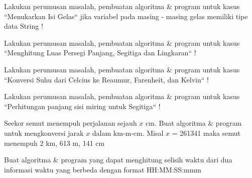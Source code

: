 \begin{pemrograman}
Lakukan perumusan masalah, pembuatan algoritma \& program untuk kasus ``Menukarkan Isi Gelas`` jika variabel pada masing - masing gelas memiliki tipe data String !
\end{pemrograman}

\begin{pemrograman}
Lakukan perumusan masalah, pembuatan algoritma \& program untuk kasus ``Menghitung Luas Persegi Panjang, Segitiga dan Lingkaran`` !
\end{pemrograman}

\begin{pemrograman}
Lakukan perumusan masalah, pembuatan algoritma \& program untuk kasus ``Konversi Suhu dari Celcius ke Reaumur, Farenheit, dan Kelvin`` !
\end{pemrograman}

\begin{pemrograman}
Lakukan perumusan masalah, pembuatan algoritma \& program untuk kasus ``Perhitungan panjang sisi miring untuk Segitiga`` !
\end{pemrograman}

\begin{pemrograman}
Seekor semut menempuh perjalanan sejauh $x$ cm. Buat algoritma \& program untuk mengkonversi jarak $x$ dalam km-m-cm. Misal $x$ = 261341
maka semut menempuh 2 km, 613 m, 141 cm
\end{pemrograman}

\begin{pemrograman}
Buat algoritma \& program yang dapat menghitung selisih waktu dari dua informasi waktu yang berbeda dengan format HH:MM:SS:mmm
\end{pemrograman}



